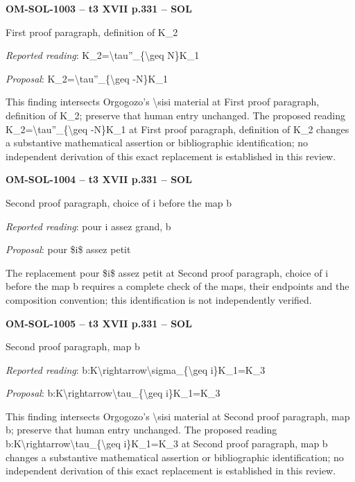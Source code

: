 \par\noindent\textbf{OM-SOL-1003 -- t3 XVII p.331 -- SOL}\par
First proof paragraph, definition of K\_2\par
\emph{Reported reading}: K\_2=\allowbreak \textbackslash{}tau''\_\{\textbackslash{}geq N\}K\_1\par
\emph{Proposal}: K\_2=\allowbreak \textbackslash{}tau''\_\{\textbackslash{}geq -N\}K\_1\par
This finding intersects Orgogozo's \textbackslash{}sisi material at First proof paragraph, definition of K\_2; preserve that human entry unchanged. The proposed reading K\_2=\allowbreak \textbackslash{}tau''\_\{\textbackslash{}geq -N\}K\_1 at First proof paragraph, definition of K\_2 changes a substantive mathematical assertion or bibliographic identification; no independent derivation of this exact replacement is established in this review.\par
\par\noindent\textbf{OM-SOL-1004 -- t3 XVII p.331 -- SOL}\par
Second proof paragraph, choice of i before the map b\par
\emph{Reported reading}: pour i assez grand, b\par
\emph{Proposal}: pour \$i\$ assez petit\par
The replacement pour \$i\$ assez petit at Second proof paragraph, choice of i before the map b requires a complete check of the maps, their endpoints and the composition convention; this identification is not independently verified.\par
\par\noindent\textbf{OM-SOL-1005 -- t3 XVII p.331 -- SOL}\par
Second proof paragraph, map b\par
\emph{Reported reading}: b:K\textbackslash{}rightarrow\textbackslash{}sigma\_\{\textbackslash{}geq i\}K\_1=\allowbreak K\_3\par
\emph{Proposal}: b:K\textbackslash{}rightarrow\textbackslash{}tau\_\{\textbackslash{}geq i\}K\_1=\allowbreak K\_3\par
This finding intersects Orgogozo's \textbackslash{}sisi material at Second proof paragraph, map b; preserve that human entry unchanged. The proposed reading b:K\textbackslash{}rightarrow\textbackslash{}tau\_\{\textbackslash{}geq i\}K\_1=\allowbreak K\_3 at Second proof paragraph, map b changes a substantive mathematical assertion or bibliographic identification; no independent derivation of this exact replacement is established in this review.\par
